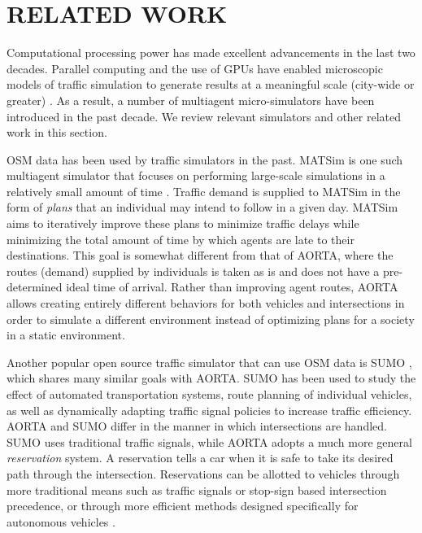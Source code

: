 \documentclass[letterpaper, 10 pt, conference]{ieeeconf}  %
\begin{document}

\section{RELATED WORK}
\label{sec:related_work}


Computational processing power has made excellent advancements in the last two
decades. Parallel computing and the use of GPUs have enabled microscopic models
of traffic simulation to generate results at a meaningful scale (city-wide or
greater) \cite{nagel1994microscopic,shen2011agent}. As a result, a number of
multiagent micro-simulators have been introduced in the past decade. We review
relevant simulators and other related work in this section.

OSM data has been used by traffic simulators in the past. MATSim is one such
multiagent simulator that focuses on performing large-scale simulations in a
relatively small amount of time \cite{balmer2009matsim}. Traffic demand is
supplied to MATSim in the form of \textit{plans} that an individual may intend
to follow in a given day. MATSim aims to iteratively improve these plans to
minimize traffic delays while minimizing the total amount of time by which agents
are late to their destinations. This goal is somewhat different from that of AORTA,
where the routes (demand) supplied by individuals is taken as is and does not have
a pre-determined ideal time of arrival. Rather than improving agent routes, AORTA
allows creating entirely different behaviors for both vehicles and intersections
in order to simulate a different environment instead of optimizing plans for a
society in a static environment.

Another popular open source traffic simulator that can use OSM data is SUMO
\cite{SUMO2011}, which shares many similar goals with AORTA. SUMO has been used to
study the effect of automated transportation systems, route planning of
individual vehicles, as well as dynamically adapting traffic signal policies to
increase traffic efficiency.  AORTA and SUMO differ in the manner in which
intersections are handled. SUMO uses traditional traffic signals, while AORTA
adopts a much more general \textit{reservation} system. A reservation tells a
car when it is safe to take its desired path through the intersection.
Reservations can be allotted to vehicles through more traditional means such as
traffic signals or stop-sign based intersection precedence, or through more
efficient methods designed specifically for autonomous vehicles
\cite{JAIR08-dresner}.
\end{document}

